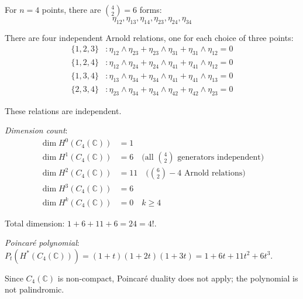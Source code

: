 \begin{example}[\texorpdfstring{$n=4$}{n=4}: multiple relations]
\label{ex:arnold-n4-complete}

For $n=4$ points, there are $\binom{4}{2} = 6$ forms:
\begin{equation}
\eta_{12}, \eta_{13}, \eta_{14}, \eta_{23}, \eta_{24}, \eta_{34}
\end{equation}

There are four independent Arnold relations, one for each choice of three points:
\begin{align}
\{1,2,3\}&: \eta_{12} \wedge \eta_{23} + \eta_{23} \wedge \eta_{31} +
\eta_{31} \wedge \eta_{12} = 0\\
\{1,2,4\}&: \eta_{12} \wedge \eta_{24} + \eta_{24} \wedge \eta_{41} +
\eta_{41} \wedge \eta_{12} = 0\\
\{1,3,4\}&: \eta_{13} \wedge \eta_{34} + \eta_{34} \wedge \eta_{41} +
\eta_{41} \wedge \eta_{13} = 0\\
\{2,3,4\}&: \eta_{23} \wedge \eta_{34} + \eta_{34} \wedge \eta_{42} +
\eta_{42} \wedge \eta_{23} = 0
\end{align}

These relations are independent.

\emph{Dimension count}:
\begin{align}
\dim H^0(C_4(\mathbb{C})) &= 1\\
\dim H^1(C_4(\mathbb{C})) &= 6 \quad \text{(all $\binom{4}{2}$ generators independent)}\\
\dim H^2(C_4(\mathbb{C})) &= 11 \quad \text{($\binom{6}{2} - 4$ Arnold relations)}\\
\dim H^3(C_4(\mathbb{C})) &= 6\\
\dim H^k(C_4(\mathbb{C})) &= 0 \quad k \geq 4
\end{align}

Total dimension: $1 + 6 + 11 + 6 = 24 = 4!$.

\emph{Poincaré polynomial}: $P_t(H^*(C_4(\mathbb{C}))) = (1+t)(1+2t)(1+3t) = 1 + 6t + 11t^2 + 6t^3$.

Since $C_4(\mathbb{C})$ is non-compact, Poincar\'{e} duality does not apply; the polynomial is not palindromic.
\end{example}

